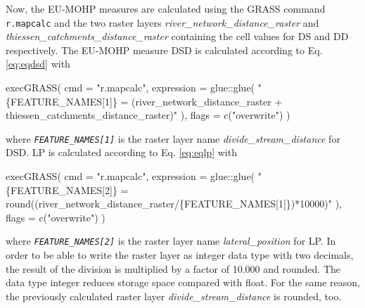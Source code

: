 \documentclass[fleqn,10pt]{wlscirep}
\newenvironment{Shaded}{\begin{snugshade}}{\end{snugshade}}
\newcommand{\AttributeTok}[1]{\textcolor[rgb]{0.77,0.63,0.00}{#1}}
\newcommand{\FunctionTok}[1]{\textcolor[rgb]{0.00,0.00,0.00}{#1}}
\newcommand{\NormalTok}[1]{#1}
\newcommand{\SpecialCharTok}[1]{\textcolor[rgb]{0.00,0.00,0.00}{#1}}
\newcommand{\StringTok}[1]{\textcolor[rgb]{0.31,0.60,0.02}{#1}}
\begin{document}
Now, the EU-MOHP\cite{nolscher_eu-mohp_2021-1} measures are calculated using the GRASS command \texttt{r.mapcalc} and the two raster layers \emph{river\_network\_distance\_raster} and \emph{thiessen\_catchments\_distance\_raster} containing the cell values for DS and DD respectively. The EU-MOHP\cite{nolscher_eu-mohp_2021-1} measure DSD is calculated according to Eq. \eqref{eq:eqdsd} with

\small

\begin{Shaded}
\begin{Highlighting}[]
\FunctionTok{execGRASS}\NormalTok{(}
  \AttributeTok{cmd =} \StringTok{"r.mapcalc"}\NormalTok{,}
  \AttributeTok{expression =}\NormalTok{ glue}\SpecialCharTok{::}\FunctionTok{glue}\NormalTok{(}
    \StringTok{"\{FEATURE\_NAMES[1]\} = (river\_network\_distance\_raster + thiessen\_catchments\_distance\_raster)"}
\NormalTok{  ),}
  \AttributeTok{flags =} \FunctionTok{c}\NormalTok{(}\StringTok{"overwrite"}\NormalTok{)}
\NormalTok{)}
\end{Highlighting}
\end{Shaded}

\normalsize
\noindent
where \emph{\texttt{FEATURE\_NAMES{[}1{]}}} is the raster layer name \emph{divide\_stream\_distance} for DSD.
LP is calculated according to Eq. \eqref{eq:eqlp} with

\small

\begin{Shaded}
\begin{Highlighting}[]
\FunctionTok{execGRASS}\NormalTok{(}
  \AttributeTok{cmd =} \StringTok{"r.mapcalc"}\NormalTok{,}
  \AttributeTok{expression =}\NormalTok{ glue}\SpecialCharTok{::}\FunctionTok{glue}\NormalTok{(}
    \StringTok{"\{FEATURE\_NAMES[2]\} = round((river\_network\_distance\_raster/\{FEATURE\_NAMES[1]\})*10000)"}
\NormalTok{  ),}
  \AttributeTok{flags =} \FunctionTok{c}\NormalTok{(}\StringTok{"overwrite"}\NormalTok{)}
\NormalTok{)}
\end{Highlighting}
\end{Shaded}

\normalsize
\noindent
where \emph{\texttt{FEATURE\_NAMES{[}2{]}}} is the raster layer name \emph{lateral\_position} for LP. In order to be able to write the raster layer as integer data type with two decimals, the result of the division is multiplied by a factor of 10.000 and rounded. The data type integer reduces storage space compared with float. For the same reason, the previously calculated raster layer \emph{divide\_stream\_distance} is rounded, too.
\end{document}
